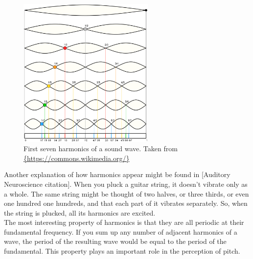 \begin{figure}[h]
	\centering
	\includegraphics[width=0.6\textwidth]{include/harmonics}
	\caption{First seven harmonics of a sound wave. Taken from \url{{https://commons.wikimedia.org/}}}
	\label{img:harmonics}
\end{figure}

Another explanation of how harmonics appear might be found in [Auditory Neuroscience citation]. When you pluck a guitar string, it doesn't vibrate only as a whole. The same string might be thought of two halves, or three thirds, or even one hundred one hundreds, and that each part of it vibrates separately. So, when the string is plucked, all its harmonics are excited.\\

The most interesting property of harmonics is that they are all periodic at their fundamental frequency. If you sum up any number of adjacent harmonics of a wave, the period of the resulting wave would be equal to the period of the fundamental. This property plays an important role in the perception of pitch.\\





